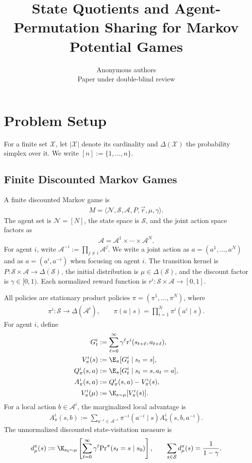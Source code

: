 \documentclass{article}
\title{State Quotients and Agent-Permutation Sharing
for Markov Potential Games}
\author{Anonymous authors\\Paper under double-blind review}
\theoremstyle{plain}
\theoremstyle{definition}
\theoremstyle{remark}
\renewcommand{\Pr}{\mathrm{Pr}}
\newcommand{\N}{\mathcal{N}}
\newcommand{\St}{\mathcal{S}}
\newcommand{\Ac}{\mathcal{A}}
\newcommand{\abs}[1]{\left\lvert#1\right\rvert}
\begin{document}
\maketitle

\section{Problem Setup}
\label{sec:preliminaries}

For a finite set $\mathcal X$, let $\abs{\mathcal X}$ denote its cardinality and
$\Delta(\mathcal X)$ the probability simplex over it. We write
$[n]:=\{1,\ldots,n\}$.

\subsection{Finite Discounted Markov Games}

A finite discounted Markov game is
\begin{align*}
  M=\langle\N,\St,\Ac,P,\vec r,\mu,\gamma\rangle.
\end{align*}
The agent set is $\N=[N]$, the state space is $\St$, and the joint action space
factors as
\begin{align*}
  \Ac=\Ac^1\times\cdots\times\Ac^N.
\end{align*}
For agent $i$, write
$\Ac^{-i}:=\prod_{j\ne i}\Ac^j$. We write a joint action as
$a=(a^1,\ldots,a^N)$ and as $a=(a^i,a^{-i})$ when focusing on agent $i$.
The transition kernel is
$P:\St\times\Ac\to\Delta(\St)$, the initial distribution is
$\mu\in\Delta(\St)$, and the discount factor is $\gamma\in[0,1)$. Each normalized
reward function is $r^i:\St\times\Ac\to[0,1]$.

All policies are stationary product policies
$\pi=(\pi^1,\ldots,\pi^N)$, where
\begin{align*}
  \pi^i:\St\to\Delta(\Ac^i),
  \qquad
  \pi(a\mid s)=\prod_{i=1}^N\pi^i(a^i\mid s).
\end{align*}
For agent $i$, define
\begin{align*}
  G_t^i
  &:=\sum_{\ell=0}^{\infty}\gamma^\ell r^i(s_{t+\ell},a_{t+\ell}),\\
  V_\pi^i(s)
  &:=\E_\pi[G_t^i\mid s_t=s],\\
  Q_\pi^i(s,a)
  &:=\E_\pi[G_t^i\mid s_t=s,a_t=a],\\
  A_\pi^i(s,a)
  &:=Q_\pi^i(s,a)-V_\pi^i(s),\\
  V_\pi^i(\mu)
  &:=\E_{s\sim\mu}[V_\pi^i(s)].
\end{align*}
For a local action $b\in\Ac^i$, the marginalized local advantage is
\begin{align}
  A_\pi^i(s,b)
  :=
  \sum_{a^{-i}\in\Ac^{-i}}
  \pi^{-i}(a^{-i}\mid s)A_\pi^i(s,b,a^{-i}).
  \label{eq:local-advantage}
\end{align}
The unnormalized discounted state-visitation measure is
\begin{align*}
  d^\pi_\mu(s)
  :=
  \E_{s_0\sim\mu}\left[
    \sum_{t=0}^{\infty}\gamma^t
    \Pr^\pi(s_t=s\mid s_0)
  \right],
  \qquad
  \sum_{s\in\St}d^\pi_\mu(s)=\frac{1}{1-\gamma}.
\end{align*}
\end{document}
